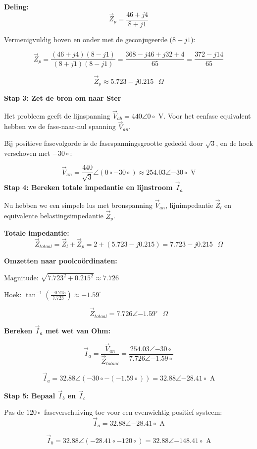 \documentclass[a4paper,11pt]{article}
\begin{document}
\begin{oefenblok}
\textbf{Deling:}
$$\vec{Z}_p = \frac{46 + j4}{8 + j1}$$

Vermenigvuldig boven en onder met de geconjugeerde ($8 - j1$):

$$\vec{Z}_p = \frac{(46 + j4)(8 - j1)}{(8 + j1)(8 - j1)} = \frac{368 - j46 + j32 + 4}{65} = \frac{372 - j14}{65}$$

$$\vec{Z}_p \approx 5.723 - j0.215 \text{ } \Omega$$

\textbf{Stap 3: Zet de bron om naar Ster}

Het probleem geeft de lijnspanning $\vec{V}_{ab} = 440\angle{0\circ}$ V. Voor het eenfase equivalent hebben we de fase-naar-nul spanning $\vec{V}_{an}$.

Bij positieve fasevolgorde is de fasespanningsgrootte gedeeld door $\sqrt{3}$, en de hoek verschoven met $-30\circ$:

$$\vec{V}_{an} = \frac{440}{\sqrt{3}}\angle{(0\circ - 30\circ)} \approx 254.03\angle{-30\circ} \text{ V}$$
\textbf{Stap 4: Bereken totale impedantie en lijnstroom $\vec{I}_a$}

Nu hebben we een simpele lus met bronspanning $\vec{V}_{an}$, lijnimpedantie $\vec{Z}_l$ en equivalente belastingsimpedantie $\vec{Z}_p$.

\textbf{Totale impedantie:}
$$\vec{Z}_{totaal} = \vec{Z}_l + \vec{Z}_p = 2 + (5.723 - j0.215) = 7.723 - j0.215 \text{ } \Omega$$

\textbf{Omzetten naar poolcoördinaten:}

Magnitude: $\sqrt{7.723^2 + 0.215^2} \approx 7.726$

Hoek: $\tan^{-1}\left(\frac{-0.215}{7.723}\right) \approx -1.59^\circ$

$$\vec{Z}_{totaal} = 7.726\angle{-1.59^\circ} \text{ } \Omega$$

\textbf{Bereken $\vec{I}_a$ met wet van Ohm:}

$$\vec{I}_a = \frac{\vec{V}_{an}}{\vec{Z}_{totaal}} = \frac{254.03\angle{-30\circ}}{7.726\angle{-1.59\circ}}$$

$$\vec{I}_a = 32.88\angle{(-30\circ - (-1.59\circ))} = 32.88\angle{-28.41\circ} \text{ A}$$

\textbf{Stap 5: Bepaal $\vec{I}_b$ en $\vec{I}_c$}

Pas de $120\circ$ faseverschuiving toe voor een evenwichtig positief systeem:
$$\vec{I}_a = 32.88\angle{-28.41\circ} \text{ A}$$

$$\vec{I}_b = 32.88\angle{(-28.41\circ - 120\circ)} = 32.88\angle{-148.41\circ} \text{ A}$$


\end{oefenblok}
\end{document}
